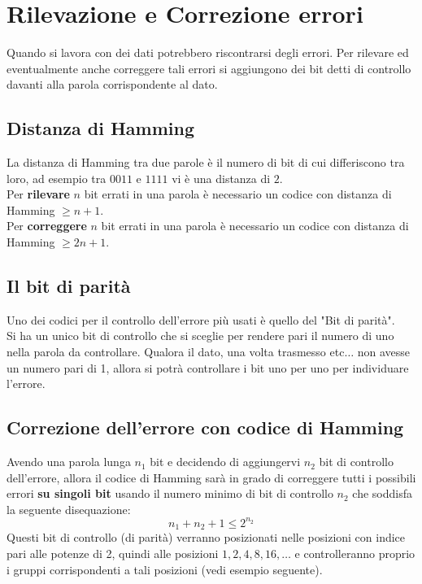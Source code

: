 \documentclass[12pt]{article}
\begin{document}
\section{Rilevazione e Correzione errori}
Quando si lavora con dei dati potrebbero riscontrarsi degli errori. Per rilevare ed eventualmente anche correggere tali errori si aggiungono dei bit detti di controllo davanti alla parola corrispondente al dato.
\subsection{Distanza di Hamming}
La distanza di Hamming tra due parole è il numero di bit di cui differiscono tra loro, ad esempio tra $0011$ e $1111$ vi è una distanza di $2$.\\
Per \textbf{rilevare} $n$ bit errati in una parola è necessario un codice con distanza di Hamming $\geq n + 1$.\\
Per \textbf{correggere} $n$ bit errati in una parola è necessario un codice con distanza di Hamming $\geq 2n+1$.
\subsection{Il bit di parità}
Uno dei codici per il controllo dell'errore più usati è quello del "Bit di parità".\\
Si ha un unico bit di controllo che si sceglie per rendere pari il numero di uno nella parola da controllare. Qualora il dato, una volta trasmesso etc$\dots$ non avesse un numero pari di 1, allora si potrà controllare i bit uno per uno per individuare l'errore.
\subsection{Correzione dell'errore con codice di Hamming}
Avendo una parola lunga $n_1$ bit e decidendo di aggiungervi $n_2$ bit di controllo dell'errore, allora il codice di Hamming sarà in grado di correggere tutti i possibili errori \textbf{su singoli bit} usando il numero minimo di bit di controllo $n_2$ che soddisfa la seguente disequazione:
\begin{equation}
    n_1 + n_2 + 1 \leq 2^{n_2} \label{eq:codice_Hamming}
\end{equation}
Questi bit di controllo (di parità) verranno posizionati nelle posizioni con indice pari alle potenze di 2, quindi alle posizioni $1, 2, 4, 8, 16, \dots$ e controlleranno proprio i gruppi corrispondenti a tali posizioni (vedi esempio seguente).
\end{document}
